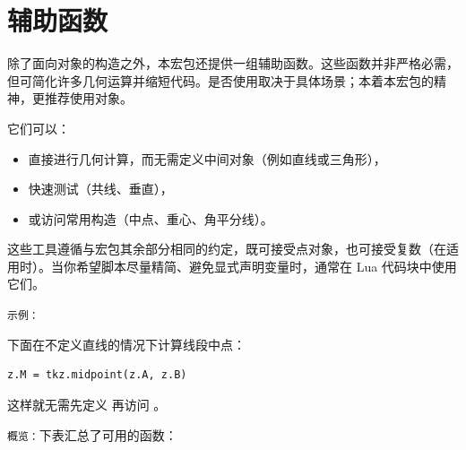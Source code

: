 \newpage
 \section{辅助函数}

除了面向对象的构造之外，本宏包还提供一组辅助函数。这些函数并非严格必需，但可简化许多几何运算并缩短代码。是否使用取决于具体场景；本着本宏包的精神，更推荐使用对象。

\medskip
它们可以：
\begin{itemize}
  \item 直接进行几何计算，而无需定义中间对象（例如直线或三角形），
  \item 快速测试（共线、垂直），
  \item 或访问常用构造（中点、重心、角平分线）。
\end{itemize}

这些工具遵循与宏包其余部分相同的约定，既可接受点对象，也可接受复数（在适用时）。当你希望脚本尽量精简、避免显式声明变量时，通常在 Lua 代码块中使用它们。

\medskip
\texttt{示例：}

下面在不定义直线的情况下计算线段中点：
\begin{mybox}
\begin{verbatim}
z.M = tkz.midpoint(z.A, z.B)
\end{verbatim}
\end{mybox}
这样就无需先定义  再访问 。

\texttt{概览：}下表汇总了可用的函数：


